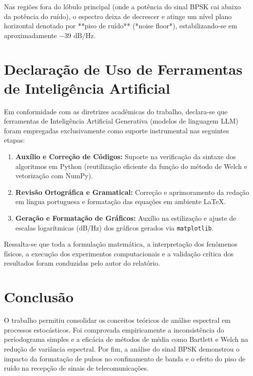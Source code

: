 \documentclass[12pt,a4paper]{article}
\begin{document}
Nas regiões fora do lóbulo principal (onde a potência do sinal BPSK cai abaixo da potência do ruído), o espectro deixa de decrescer e atinge um nível plano horizontal denotado por **piso de ruído** (*noise floor*), estabilizando-se em aproximadamente $-39 \text{ dB/Hz}$.

\section{Declaração de Uso de Ferramentas de Inteligência Artificial}

Em conformidade com as diretrizes acadêmicas do trabalho, declara-se que ferramentas de Inteligência Artificial Generativa (modelos de linguagem LLM) foram empregadas exclusivamente como suporte instrumental nas seguintes etapas:
\begin{enumerate}
    \item \textbf{Auxílio e Correção de Códigos:} Suporte na verificação da sintaxe dos algoritmos em Python (reutilização eficiente da função do método de Welch e vetorização com NumPy).
    \item \textbf{Revisão Ortográfica e Gramatical:} Correção e aprimoramento da redação em língua portuguesa e formatação das equações em ambiente \LaTeX.
    \item \textbf{Geração e Formatação de Gráficos:} Auxílio na estilização e ajuste de escalas logarítmicas (dB/Hz) dos gráficos gerados via \texttt{matplotlib}.
\end{enumerate}
Ressalta-se que toda a formulação matemática, a interpretação dos fenômenos físicos, a execução dos experimentos computacionais e a validação crítica dos resultados foram conduzidas pelo autor do relatório.

\section{Conclusão}
O trabalho permitiu consolidar os conceitos teóricos de análise espectral em processos estocásticos. Foi comprovada empiricamente a inconsistência do periodograma simples e a eficácia de métodos de média como Bartlett e Welch na redução de variância espectral. Por fim, a análise do sinal BPSK demonstrou o impacto da formatação de pulsos no confinamento de banda e o efeito do piso de ruído na recepção de sinais de telecomunicações.
\end{document}
